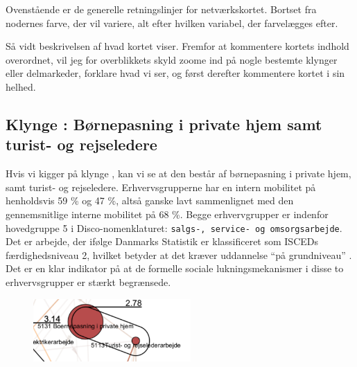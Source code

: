 Ovenstående er de generelle retningslinjer for netværkskortet. Bortset fra nodernes farve, der vil variere, alt efter hvilken variabel, der farvelægges efter. 

Så vidt beskrivelsen af hvad kortet viser. Fremfor at kommentere kortets indhold overordnet, vil jeg for overblikkets skyld zoome ind på nogle bestemte klynger eller delmarkeder, forklare hvad vi ser, og først derefter kommentere kortet i sin helhed.

\subsection{Klynge : Børnepasning i private hjem samt turist- og rejseledere}

Hvis vi kigger på klynge , kan vi se at den består af børnepasning i private hjem, samt turist- og rejseledere. Erhvervsgrupperne har en intern mobilitet på henholdsvis  59 \% og 47 \%, altså ganske lavt sammenlignet med den gennemsnitlige interne mobilitet på 68 \%.  Begge erhvervgrupper er indenfor hovedgruppe 5 i Disco-nomenklaturet: \texttt{salgs-, service- og omsorgsarbejde}. Det er arbejde, der ifølge Danmarks Statistik er klassificeret som ISCEDs færdighedsniveau 2, hvilket betyder at det kræver uddannelse “på grundniveau” \parencite[tabel 1]{DSTDISCO88}. Det er en klar indikator på at de formelle sociale lukningsmekanismer i disse to erhvervsgrupper er stærkt begrænsede.

%
\begin{figure}
  \vspace{-20pt}
  \begin{center}
    \includegraphics[width=6cm]{fig/segzoom/seg_2_78.pdf}
   \caption{}
   \label{fig_delanalyse1_zoom_2_78}
  \end{center}
  \vspace{-20pt}
\end{figure}
%

